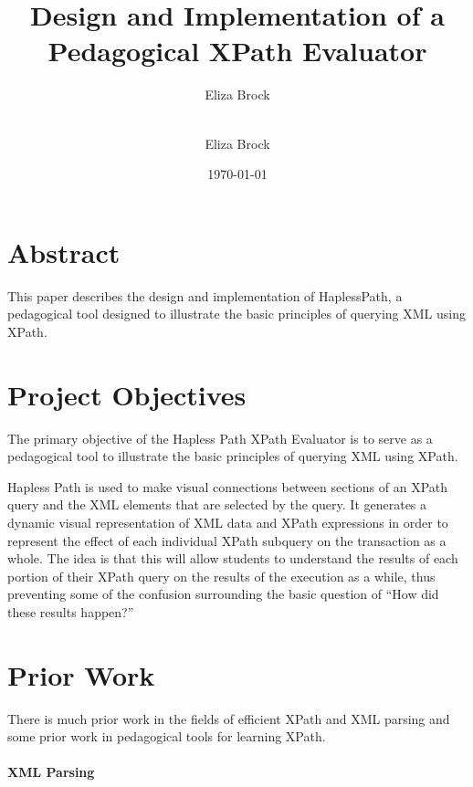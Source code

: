 \documentclass{acm_proc_article-sp}
\begin{document}
\title{Design and Implementation of a Pedagogical XPath Evaluator}
\author{
\alignauthor 
Eliza Brock \\
      \\
}
\author{Eliza Brock}
\date{\today}
\maketitle

\section*{Abstract}
This paper describes the design and implementation of HaplessPath, a pedagogical tool designed to illustrate the basic principles of querying XML\cite{xmlspec}   using XPath\cite{xpathspec}.

\section{Project Objectives}

The primary objective of the Hapless Path XPath Evaluator is to serve as a pedagogical tool to illustrate the basic principles of querying XML using XPath.  

Hapless Path is used to make visual connections between sections of an XPath query and the XML elements that are selected by the query.  It generates a dynamic visual representation of XML data and XPath expressions in order to represent the effect of each individual XPath subquery on the transaction as a whole. The idea is that this will allow students to understand the results of each portion of their XPath query on the results of the execution as a while, thus preventing some of the confusion surrounding the basic question of ``How did these results happen?''

\section{Prior Work}

There is much prior work in the fields of efficient XPath and XML parsing and some prior work in pedagogical tools for learning XPath.

\paragraph{XML Parsing}
\end{document}
